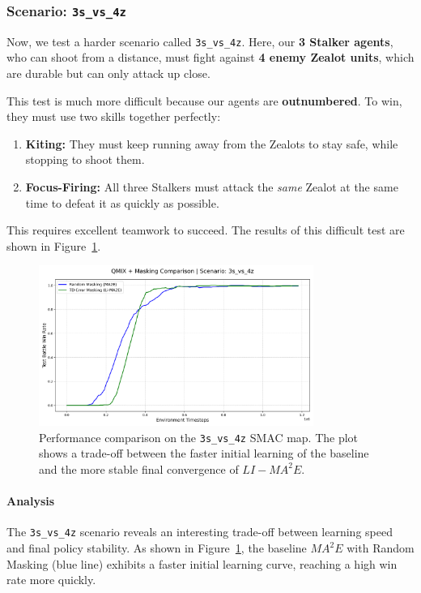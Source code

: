 \subsubsection{Scenario: \texttt{3s\_vs\_4z}}

Now, we test a harder scenario called \texttt{3s\_vs\_4z}. Here, our \textbf{3 Stalker agents}, who can shoot from a distance, must fight against \textbf{4 enemy Zealot units}, which are durable but can only attack up close.

This test is much more difficult because our agents are \textbf{outnumbered}. To win, they must use two skills together perfectly:
\begin{enumerate}
    \item \textbf{Kiting:} They must keep running away from the Zealots to stay safe, while stopping to shoot them.
    \item \textbf{Focus-Firing:} All three Stalkers must attack the \textit{same} Zealot at the same time to defeat it as quickly as possible.
\end{enumerate}
This requires excellent teamwork to succeed. The results of this difficult test are shown in Figure~\ref{fig:3s_vs_4z}.

\begin{figure}[h]
    \centering
     \includegraphics[width=0.8\textwidth]{images_pfe/results_li-ma2e/comparison_plot_3s_vs_4z.png}
    \caption{Performance comparison on the \texttt{3s\_vs\_4z} SMAC map. The plot shows a trade-off between the faster initial learning of the baseline and the more stable final convergence of $LI-{MA}^2E$.}
    \label{fig:3s_vs_4z}
\end{figure}

\paragraph{Analysis}
The \texttt{3s\_vs\_4z} scenario reveals an interesting trade-off between learning speed and final policy stability. As shown in Figure~\ref{fig:3s_vs_4z}, the baseline ${MA}^2E$ with Random Masking (blue line) exhibits a faster initial learning curve, reaching a high win rate more quickly.

